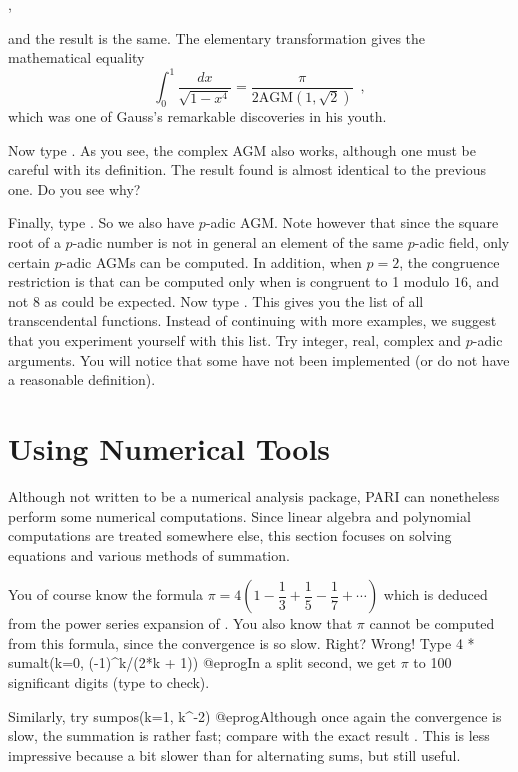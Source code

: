 ,

\noindent and the result is the same. The elementary transformation
 gives the mathematical equality
$$\int_0^1 \dfrac{dx}{\sqrt{1-x^4}} = \dfrac{\pi}{2\text{AGM}(1,\sqrt2)}
\enspace,$$
which was one of Gauss's remarkable discoveries in his youth.

Now type . As you see, the complex AGM also works,
although one must be careful with its definition. The result found is
almost identical to the previous one. Do you see why?

Finally, type . So we also have $p$-adic
AGM. Note however that since the square root of a $p$-adic number is not
in general an element of the same $p$-adic field,
only certain $p$-adic AGMs can be computed. In addition,
when $p=2$, the congruence restriction is that  can be computed
only when  is congruent to 1 modulo $16$, and not 8 as could be
expected.\smallskip
%
Now type . This gives you the list of all transcendental functions.
Instead of continuing with more examples, we suggest that you experiment
yourself with this list. Try integer, real, complex and $p$-adic arguments.
You will notice that some have not been implemented (or do not have a
reasonable definition).

\section{Using Numerical Tools}

 Although not written to be a numerical analysis package, PARI can
nonetheless perform some numerical computations. Since linear algebra and
polynomial computations are treated somewhere else, this section focuses on
solving equations and various methods of summation.

You of course know the formula $\pi = 4(1-\dfrac13+\dfrac15-\dfrac17+\cdots)$
which is deduced from the power series expansion of . You also
know that $\pi$ cannot be computed from this formula, since the convergence
is so slow. Right? Wrong! Type
\bprog
  4 * sumalt(k=0, (-1)^k/(2*k + 1))
@eprog\noindent In a split second, we get $\pi$ to 100 significant digits
(type  to check).

Similarly, try
\bprog
  sumpos(k=1, k^-2)
@eprog\noindent Although once again the convergence is slow, the summation is
rather fast; compare with the exact result . This is less
impressive because a bit slower than for alternating sums, but still useful.

